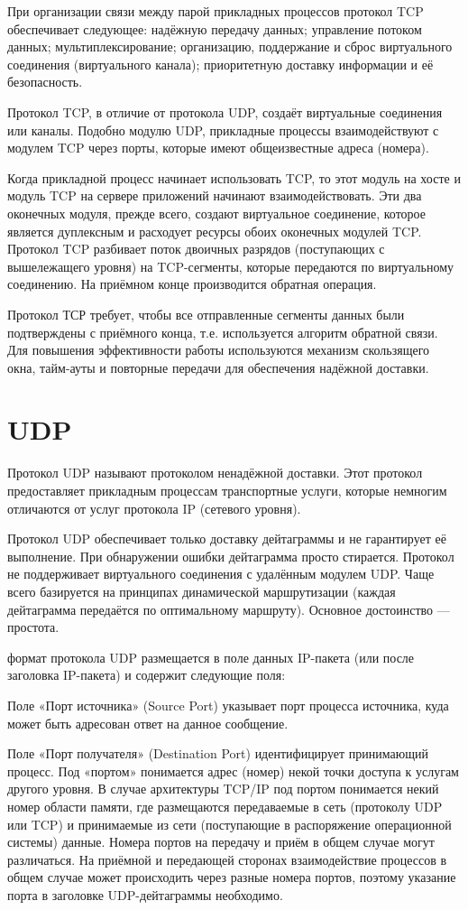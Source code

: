 \documentclass[12pt,a4paper]{report}
\begin{document}
      При организации связи между парой прикладных процессов протокол TCP обеспечивает следующее: надёжную передачу данных; управление потоком данных; мультиплексирование; организацию, поддержание и сброс виртуального соединения (виртуального канала); приоритетную доставку информации и её безопасность.

      Протокол TCP, в отличие от протокола UDP, создаёт виртуальные соединения или каналы. Подобно модулю UDP, прикладные процессы взаимодействуют с модулем TCP через порты, которые имеют общеизвестные адреса (номера).

Когда прикладной процесс начинает использовать TCP, то этот модуль на хосте и модуль TCP на сервере приложений начинают взаимодействовать. Эти два оконечных модуля, прежде всего, создают виртуальное соединение, которое является дуплексным и расходует ресурсы обоих оконечных модулей TCP. Протокол TCP разбивает поток двоичных разрядов (поступающих с вышележащего уровня) на TCP-сегменты, которые передаются по виртуальному соединению. На приёмном конце производится обратная операция.

      Протокол ТСР требует, чтобы все отправленные сегменты данных были подтверждены с приёмного конца, т.е. используется алгоритм обратной связи. Для повышения эффективности работы используются механизм скользящего окна, тайм-ауты и повторные передачи для обеспечения надёжной доставки. 
\section{UDP}
	Протокол UDP называют протоколом ненадёжной доставки. Этот протокол предоставляет прикладным процессам транспортные услуги, которые немногим отличаются от услуг протокола IP (сетевого уровня).

      Протокол UDP обеспечивает только доставку дейтаграммы и не гарантирует её выполнение. При обнаружении ошибки дейтаграмма просто стирается. Протокол не поддерживает виртуального соединения с удалённым модулем UDP. Чаще всего базируется на принципах динамической маршрутизации (каждая дейтаграмма передаётся по оптимальному маршруту). Основное достоинство — простота.

формат протокола UDP размещается в поле данных IP-пакета (или после заголовка IP-пакета) и содержит следующие поля:

      Поле «Порт источника» (Source Port) указывает порт процесса источника, куда может быть адресован ответ на данное сообщение.

      Поле «Порт получателя» (Destination Port) идентифицирует принимающий процесс.
Под «портом» понимается адрес (номер) некой точки доступа к услугам другого уровня. В случае архитектуры TCP/IP под портом понимается некий номер области памяти, где размещаются передаваемые в сеть (протоколу UDP или TCP) и принимаемые из сети (поступающие в распоряжение операционной системы) данные. Номера портов на передачу и приём в общем случае могут различаться. На приёмной и передающей сторонах взаимодействие процессов в общем случае может происходить через разные номера портов, поэтому указание порта в заголовке UDP-дейтаграммы необходимо.
\end{document}
